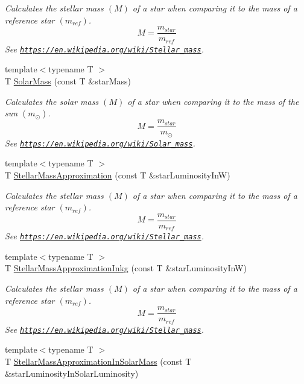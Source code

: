 \begin{DoxyCompactItemize}
\begin{DoxyCompactList}\small\item\em Calculates the stellar mass $(M)$ of a star when comparing it to the mass of a reference star $(m_{ref})$. \[M=\frac{m_{star}}{m_{ref}}\] See \href{https://en.wikipedia.org/wiki/Stellar_mass}{\tt https\+://en.\+wikipedia.\+org/wiki/\+Stellar\+\_\+mass}. \end{DoxyCompactList}\item 
{\footnotesize template$<$typename T $>$ }\\T \mbox{\hyperlink{group___e_g_x_phys-_stellar_mass_gac393d64d586be3dc76ac7a98ac336514}{Solar\+Mass}} (const T \&star\+Mass)
\begin{DoxyCompactList}\small\item\em Calculates the solar mass $(M)$ of a star when comparing it to the mass of the sun $(m_\odot)$. \[M=\frac{m_{star}}{m_\odot}\] See \href{https://en.wikipedia.org/wiki/Solar_mass}{\tt https\+://en.\+wikipedia.\+org/wiki/\+Solar\+\_\+mass}. \end{DoxyCompactList}\item 
{\footnotesize template$<$typename T $>$ }\\T \mbox{\hyperlink{group___e_g_x_phys-_stellar_mass_gad4da54e02d03fe56e7da736f7d12b42c}{Stellar\+Mass\+Approximation}} (const T \&star\+Luminosity\+InW)
\begin{DoxyCompactList}\small\item\em Calculates the stellar mass $(M)$ of a star when comparing it to the mass of a reference star $(m_{ref})$. \[M=\frac{m_{star}}{m_{ref}}\] See \href{https://en.wikipedia.org/wiki/Stellar_mass}{\tt https\+://en.\+wikipedia.\+org/wiki/\+Stellar\+\_\+mass}. \end{DoxyCompactList}\item 
{\footnotesize template$<$typename T $>$ }\\T \mbox{\hyperlink{group___e_g_x_phys-_stellar_mass_ga21d4a1964c4fada8367804113d9f3123}{Stellar\+Mass\+Approximation\+Inkg}} (const T \&star\+Luminosity\+InW)
\begin{DoxyCompactList}\small\item\em Calculates the stellar mass $(M)$ of a star when comparing it to the mass of a reference star $(m_{ref})$. \[M=\frac{m_{star}}{m_{ref}}\] See \href{https://en.wikipedia.org/wiki/Stellar_mass}{\tt https\+://en.\+wikipedia.\+org/wiki/\+Stellar\+\_\+mass}. \end{DoxyCompactList}\item 
{\footnotesize template$<$typename T $>$ }\\T \mbox{\hyperlink{group___e_g_x_phys-_stellar_mass_gaa00fb881be48df4eba9838ada6bffa33}{Stellar\+Mass\+Approximation\+In\+Solar\+Mass}} (const T \&star\+Luminosity\+In\+Solar\+Luminosity)

\end{DoxyCompactItemize}
